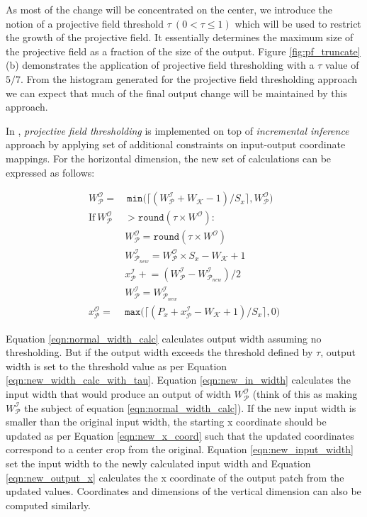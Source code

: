 As most of the change will be concentrated on the center, we introduce the notion of a projective field threshold $\tau ~ (0 < \tau \leq 1)$ which will be used to restrict the growth of the projective field.
It essentially determines the maximum size of the projective field as a fraction of the size of the output.
Figure \ref{fig:pf_truncate} (b) demonstrates the application of projective field thresholding with a $\tau$ value of $5/7$.
From the histogram generated for the projective field thresholding approach we can expect that much of the final output change will be maintained by this approach.

In \system, \textit{projective field thresholding} is implemented on top of \textit{incremental inference} approach by applying set of additional constraints on input-output coordinate mappings. For the horizontal dimension, the new set of calculations can be expressed as follows:

\begin{align}
\label{eqn:normal_width_calc}
W^\mathcal{O}_\mathcal{P} = &~ \texttt{min}\big(\lceil (W^\mathcal{I}_\mathcal{P} + W_\mathcal{K} - 1)/S_x \rceil, W^\mathcal{O}_\mathcal{P}\big)\\
\label{eqn:check_tau}
\text{If}~ W_\mathcal{P}^\mathcal{O} & > \texttt{round}(\tau \times W^\mathcal{O}):\\
\label{eqn:new_width_calc_with_tau}
& W^\mathcal{O}_\mathcal{P} = \texttt{round}(\tau \times W^\mathcal{O})\\
\label{eqn:new_in_width}
& W^\mathcal{I}_{\mathcal{P}_{new}} = W^\mathcal{O}_{\mathcal{P}} \times S_x - W_{\mathcal{K}} + 1\\
\label{eqn:new_x_coord}
& x^{\mathcal{I}}_\mathcal{P} \mathrel{+}= (W^\mathcal{I}_\mathcal{P} - W^\mathcal{I}_{\mathcal{P}_{new}})/2\\
\label{eqn:new_input_width}
& W^\mathcal{I}_{\mathcal{P}} = W^\mathcal{I}_{\mathcal{P}_{new}}\\
\label{eqn:new_output_x}
x^\mathcal{O}_\mathcal{P} = & \texttt{max}\big(\lceil (P_x + x^\mathcal{I}_\mathcal{P} - W_\mathcal{K} + 1)/S_x \rceil, 0\big)
\end{align}

Equation \ref{eqn:normal_width_calc} calculates output width assuming no thresholding. But if the output width exceeds the threshold defined by $\tau$, output width is set to the threshold value as per Equation \ref{eqn:new_width_calc_with_tau}.
Equation \ref{eqn:new_in_width} calculates the input width that would produce an output of width $W^\mathcal{O}_\mathcal{P}$ (think of this as making $W^{\mathcal{I}}_{\mathcal{P}}$ the subject of equation \ref{eqn:normal_width_calc}).
If the new input width is smaller than the original input width, the starting x coordinate should be updated as per Equation \ref{eqn:new_x_coord} such that the updated coordinates correspond to a center crop from the original.
Equation \ref{eqn:new_input_width} set the input width to the newly calculated input width and Equation \ref{eqn:new_output_x} calculates the x coordinate of the output patch from the updated values.
Coordinates and dimensions of the vertical dimension can also be computed similarly.


